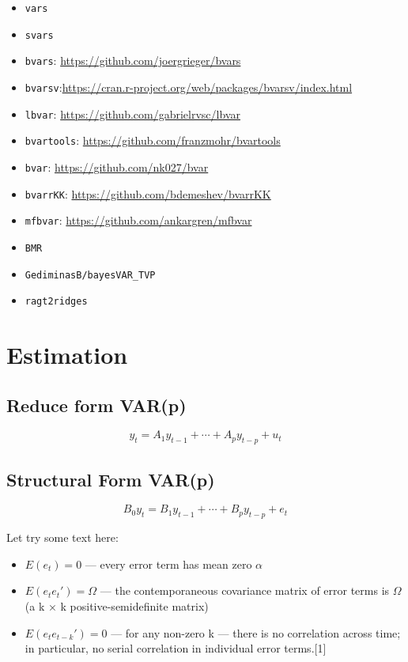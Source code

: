 \documentclass[
]{article}
\providecommand{\tightlist}{%
  \setlength{\itemsep}{0pt}\setlength{\parskip}{0pt}}
\begin{document}
\begin{itemize}
\tightlist
\item
  \texttt{vars}
\item
  \texttt{svars}
\item
  \texttt{bvars}: \url{https://github.com/joergrieger/bvars}
\item
  \texttt{bvarsv}:\url{https://cran.r-project.org/web/packages/bvarsv/index.html}
\item
  \texttt{lbvar}: \url{https://github.com/gabrielrvsc/lbvar}
\item
  \texttt{bvartools}: \url{https://github.com/franzmohr/bvartools}
\item
  \texttt{bvar}: \url{https://github.com/nk027/bvar}
\item
  \texttt{bvarrKK}: \url{https://github.com/bdemeshev/bvarrKK}
\item
  \texttt{mfbvar}: \url{https://github.com/ankargren/mfbvar}
\item
  \texttt{BMR}
\item
  \texttt{GediminasB/bayesVAR\_TVP}
\item
  \texttt{ragt2ridges}
\end{itemize}

\hypertarget{estimation}{%
\section{Estimation}\label{estimation}}

\hypertarget{reduce-form-varp}{%
\subsection{Reduce form VAR(p)}\label{reduce-form-varp}}

\[y_{t}= A_1y_{t-1} + \cdots + A_p y_{t-p} + u_t\]

\hypertarget{structural-form-varp}{%
\subsection{Structural Form VAR(p)}\label{structural-form-varp}}

\[B_0y_{t}= B_{1}y_{{t-1}}+\cdots +B_{p}y_{{t-p}}+e_{t}\]

Let try some text here:

\begin{itemize}
\item
  \(E(e_t) = 0\) --- every error term has mean zero \(\alpha\)
\item
  \(E (e_{t}e_{t}')= \Omega\) --- the contemporaneous covariance matrix of error terms is \(\Omega\)
  (a k × k positive-semidefinite matrix)
\item
  \(E(e_{t}e_{{t-k}}')=0\) --- for any non-zero k --- there is no correlation across time; in particular, no serial correlation in individual error terms.{[}1{]}
\end{itemize}
\end{document}

